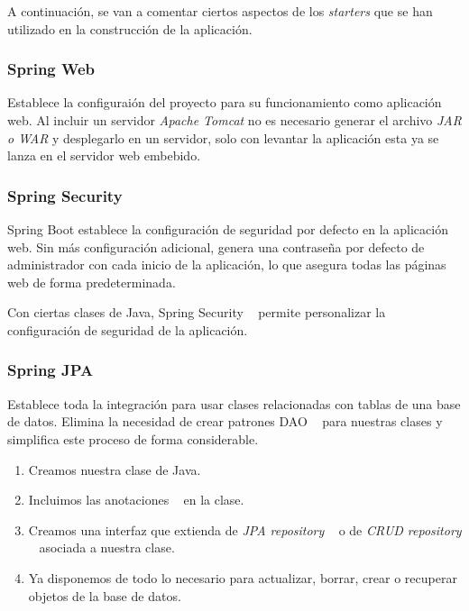 A continuación, se van a comentar ciertos aspectos de los \textit{starters} que se han utilizado en la construcción de la aplicación.

\subsubsection{Spring Web}

Establece la configuraión del proyecto para su funcionamiento como aplicación web. Al incluir un servidor \textit{Apache Tomcat} no es necesario generar el archivo \textit{JAR o WAR} y desplegarlo en un servidor, solo con levantar la aplicación esta ya se lanza en el servidor web embebido.
 

\subsubsection{Spring Security}

Spring Boot establece la configuración de seguridad por defecto en la aplicación web. Sin más configuración adicional, genera una contraseña por defecto de administrador con cada inicio de la aplicación, lo que asegura todas las páginas web de forma predeterminada.

Con ciertas clases de Java, Spring Security ~\cite{web:springSecurity} permite personalizar la configuración de seguridad de la aplicación.

\subsubsection{Spring JPA}

Establece toda la integración para usar clases relacionadas con tablas de una base de datos. Elimina la necesidad de crear patrones DAO ~\cite{web:dao} para nuestras clases y simplifica este proceso de forma considerable.

\begin{enumerate}
	\item Creamos nuestra clase de Java.
	\item Incluimos las anotaciones ~\cite{web:anotacionesJPA} en la clase.
	\item Creamos una interfaz que extienda de \textit{JPA repository}  ~\cite{web:springJPArepo} o de \textit{CRUD repository} ~\cite{web:springCRUDrepo} asociada a nuestra clase.
	\item Ya disponemos de todo lo necesario para actualizar, borrar, crear o recuperar objetos de la base de datos.
\end{enumerate}

